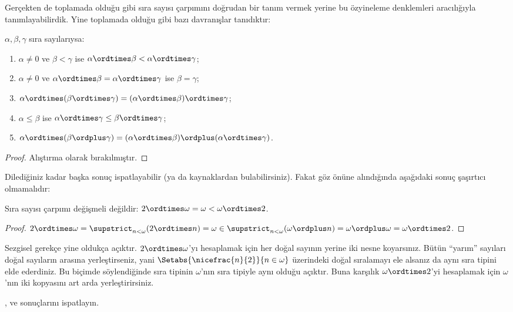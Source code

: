 \documentclass[../../../include/open-logic-section]{subfiles}
\begin{document}
Gerçekten de toplamada olduğu gibi sıra sayısı çarpımını doğrudan bir tanım
vermek yerine bu özyineleme denklemleri aracılığıyla tanımlayabilirdik.
Yine toplamada olduğu gibi bazı davranışlar tanıdıktır:

\begin{lem}
$\alpha,\beta,\gamma$ sıra sayılarıysa:
\begin{enumerate}
	\item{} $\alpha\neq 0$ ve $\beta<\gamma$ ise
	$\alpha\ordtimes\beta<\alpha\ordtimes\gamma$;
	\item{} $\alpha\neq 0$ ve
	$\alpha\ordtimes\beta=\alpha\ordtimes\gamma$ ise $\beta=\gamma$;
	\item{} $\alpha\ordtimes(\beta\ordtimes\gamma)
	=(\alpha\ordtimes\beta)\ordtimes\gamma$;
	\item{} $\alpha\leq\beta$ ise
	$\alpha\ordtimes\gamma\leq\beta\ordtimes\gamma$;
	\item{} $\alpha\ordtimes(\beta\ordplus\gamma)
	=(\alpha\ordtimes\beta)\ordplus(\alpha\ordtimes\gamma)$.
\end{enumerate}
\end{lem}

\begin{proof}
Alıştırma olarak bırakılmıştır.
\end{proof}

Dilediğiniz kadar başka sonuç ispatlayabilir (ya da kaynaklardan
bulabilirsiniz). Fakat
 göz önüne alındığında aşağıdaki
sonuç şaşırtıcı olmamalıdır:

\begin{prop}
Sıra sayısı çarpımı değişmeli değildir:
$2\ordtimes\omega=\omega<\omega\ordtimes 2$.
\end{prop}

\begin{proof}
$2\ordtimes\omega=\supstrict_{n<\omega}(2\ordtimes n)=\omega
\in\supstrict_{n<\omega}(\omega\ordplus n)=\omega\ordplus\omega
=\omega\ordtimes 2$.
\end{proof}
\noindent
Sezgisel gerekçe yine oldukça açıktır. $2\ordtimes\omega$'yı hesaplamak için
her doğal sayının yerine iki nesne koyarsınız. Bütün ``yarım'' sayıları doğal
sayıların arasına yerleştirseniz, yani
$\Setabs{\nicefrac{n}{2}}{n\in\omega}$ üzerindeki doğal sıralamayı ele
alsanız da aynı sıra tipini elde ederdiniz. Bu biçimde söylendiğinde sıra
tipinin $\omega$'nın sıra tipiyle aynı olduğu açıktır. Buna karşılık
$\omega\ordtimes 2$'yi hesaplamak için $\omega$'nın iki kopyasını art arda
yerleştirirsiniz.

\begin{prob}
,
 ve
 sonuçlarını
ispatlayın.
\end{prob}
\end{document}
